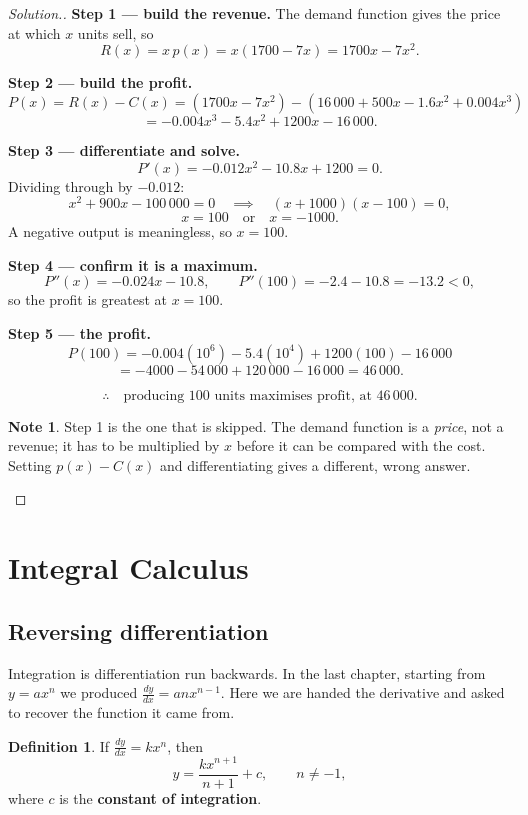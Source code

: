 \documentclass[11pt,a4paper]{article}
\theoremstyle{definition}
\newtheorem{definition}[thm]{Definition}
\newtheorem{note}[thm]{Note}
\newenvironment{solution}
  {\renewcommand{\qedsymbol}{}\begin{proof}[\textit{Solution}.]}
  {\end{proof}}
\begin{document}
\begin{solution}
\textbf{Step 1 --- build the revenue.} The demand function gives the price at which $x$
units sell, so
$$R(x)=x\,p(x)=x(1700-7x)=1700x-7x^2.$$

\textbf{Step 2 --- build the profit.}
$$P(x)=R(x)-C(x)=\left(1700x-7x^2\right)
-\left(16\,000+500x-1.6x^2+0.004x^3\right)$$
$$=-0.004x^3-5.4x^2+1200x-16\,000.$$

\textbf{Step 3 --- differentiate and solve.}
$$P'(x)=-0.012x^2-10.8x+1200=0.$$
Dividing through by $-0.012$:
$$x^2+900x-100\,000=0\quad\implies\quad (x+1000)(x-100)=0,$$
$$x=100\quad\text{or}\quad x=-1000.$$
A negative output is meaningless, so $x=100$.

\textbf{Step 4 --- confirm it is a maximum.}
$$P''(x)=-0.024x-10.8,\qquad P''(100)=-2.4-10.8=-13.2<0,$$
so the profit is greatest at $x=100$.

\textbf{Step 5 --- the profit.}
$$P(100)=-0.004(10^6)-5.4(10^4)+1200(100)-16\,000$$
$$=-4000-54\,000+120\,000-16\,000=46\,000.$$

$$\therefore\quad \text{producing } 100 \text{ units maximises profit, at } 46\,000.$$

\begin{note}
Step 1 is the one that is skipped. The demand function is a \emph{price}, not a revenue;
it has to be multiplied by $x$ before it can be compared with the cost. Setting
$p(x)-C(x)$ and differentiating gives a different, wrong answer.
\end{note}
\end{solution}

\section{Integral Calculus}

\subsection{Reversing differentiation}

Integration is differentiation run backwards. In the last chapter, starting from
$y=ax^n$ we produced $\frac{dy}{dx}=anx^{n-1}$. Here we are handed the derivative and
asked to recover the function it came from.

\begin{definition}
If $\frac{dy}{dx}=kx^n$, then
$$y=\frac{kx^{n+1}}{n+1}+c,\qquad n\neq -1,$$
where $c$ is the \textbf{constant of integration}.
\end{definition}
\end{document}
